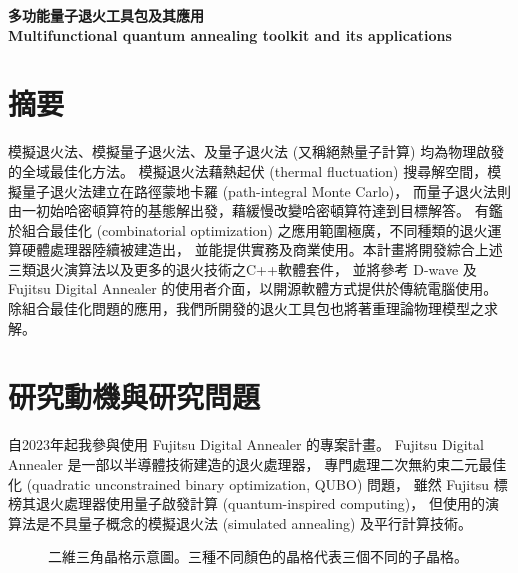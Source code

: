 \documentclass[12pt]{article}
\begin{document}
\noindent
{\bfseries \large 多功能量子退火工具包及其應用}\\
{\bfseries Multifunctional quantum annealing toolkit and its applications}

\section{摘要}
\label{sec: abstract}
模擬退火法、模擬量子退火法、及量子退火法 (又稱絕熱量子計算) 均為物理啟發的全域最佳化方法。
模擬退火法藉熱起伏 (thermal fluctuation) 搜尋解空間，模擬量子退火法建立在路徑蒙地卡羅 (path-integral Monte Carlo)，
而量子退火法則由一初始哈密頓算符的基態解出發，藉緩慢改變哈密頓算符達到目標解答。
有鑑於組合最佳化 (combinatorial optimization) 之應用範圍極廣，不同種類的退火運算硬體處理器陸續被建造出，
並能提供實務及商業使用。本計畫將開發綜合上述三類退火演算法以及更多的退火技術之C++軟體套件，
並將參考 D-wave 及Fujitsu Digital Annealer 的使用者介面，以開源軟體方式提供於傳統電腦使用。
除組合最佳化問題的應用，我們所開發的退火工具包也將著重理論物理模型之求解。


\section{研究動機與研究問題}
\label{sec:motivation}

自2023年起我參與使用 Fujitsu Digital Annealer 的專案計畫。
Fujitsu Digital Annealer 是一部以半導體技術建造的退火處理器，
專門處理二次無約束二元最佳化 (quadratic unconstrained binary optimization, QUBO) 問題，
雖然 Fujitsu 標榜其退火處理器使用量子啟發計算 (quantum-inspired computing)，
但使用的演算法是不具量子概念的模擬退火法 (simulated annealing) 及平行計算技術。

\begin{figure}[htp!]
{\par\centering {} \par}
\caption{
二維三角晶格示意圖。三種不同顏色的晶格代表三個不同的子晶格。
 \label{fig:triangle}
 }
\end{figure}
\end{document}

